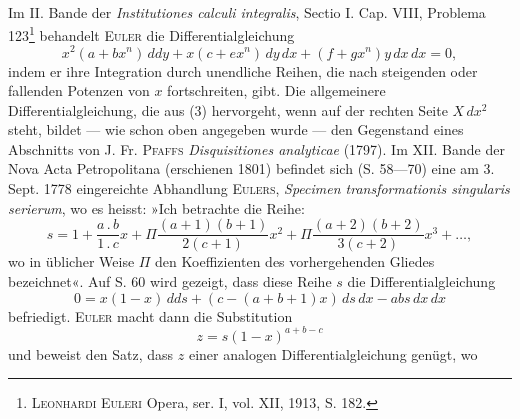 \par\medskip
\begin{center}
\\
\end{center}
\noindent\hspace*{\parindent}Im II. Bande der \textit{Institutiones calculi integralis}, Sectio I. Cap. VIII, Problema
123\footnote{\textsc{Leonhardi Euleri} Opera, ser. I, vol. XII, 1913, S. 182.} behandelt \textsc{Euler} die Differentialgleichung
\begingroup\makeatletter\tagsleft@true\let\veqno\leqno\makeatother
\begin{equation*}
x^2(a+bx^n)\,ddy+x(c+ex^n)\,dy\,dx+(f+gx^n)y\,dx\,dx=0,\tag{3}
\end{equation*}\endgroup
\noindent indem er ihre Integration durch unendliche Reihen, die nach steigenden oder
fallenden Potenzen von \(x\) fortschreiten, gibt. Die allgemeinere Differentialgleichung,
die aus (3) hervorgeht, wenn auf der rechten Seite \(X\,dx^2\) steht,
bildet — wie schon oben angegeben wurde — den Gegenstand eines Abschnitts
von J. Fr. \textsc{Pfaffs} \textit{Disquisitiones analyticae} (1797). Im XII. Bande
der Nova Acta Petropolitana (erschienen 1801) befindet sich (S. 58—70) eine
am 3. Sept. 1778 eingereichte Abhandlung \textsc{Eulers}, \textit{Specimen transformationis
singularis serierum}, wo es heisst: »Ich betrachte die Reihe:
\begingroup\makeatletter\tagsleft@true\let\veqno\leqno\makeatother
\begin{equation*}
s=1+\frac{a\mathbin{.}b}{1\mathbin{.}c}x
+\Pi\frac{(a+1)(b+1)}{2(c+1)}x^2
+\Pi\frac{(a+2)(b+2)}{3(c+2)}x^3+\ldots,\tag{4}
\end{equation*}\endgroup
\noindent wo in üblicher Weise \(\Pi\) den Koeffizienten des vorhergehenden Gliedes bezeichnet«.
Auf S. 60 wird gezeigt, dass diese Reihe \(s\) die Differentialgleichung
\begingroup\makeatletter\tagsleft@true\let\veqno\leqno\makeatother
\begin{equation*}
0=x(1-x)\,dds+(c-(a+b+1)x)\,ds\,dx-abs\,dx\,dx\tag{5}
\end{equation*}\endgroup
\noindent befriedigt. \textsc{Euler} macht dann die Substitution
\begingroup\makeatletter\tagsleft@true\let\veqno\leqno\makeatother
\begin{equation*}
z=s(1-x)^{a+b-c}\tag{6}
\end{equation*}\endgroup
\noindent und beweist den Satz, dass \(z\) einer analogen Differentialgleichung genügt, wo
